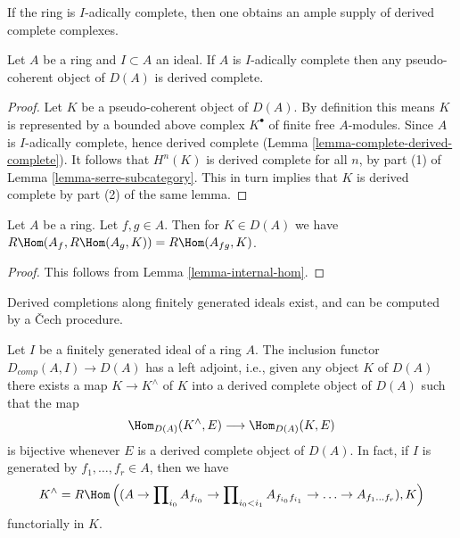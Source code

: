 \noindent
If the ring is $I$-adically complete, then one obtains an ample supply
of derived complete complexes.

\begin{lemma}
\label{lemma-pseudo-coherent-is-derived-complete}
Let $A$ be a ring and $I \subset A$ an ideal. If $A$ is $I$-adically complete
then any pseudo-coherent object of $D(A)$ is derived complete.
\end{lemma}

\begin{proof}
Let $K$ be a pseudo-coherent object of $D(A)$. By definition this
means $K$ is represented by a bounded above complex $K^\bullet$
of finite free $A$-modules. Since $A$ is $I$-adically complete, hence
derived complete (Lemma \ref{lemma-complete-derived-complete}).
It follows that $H^n(K)$ is derived complete for all $n$, by part (1)
of Lemma \ref{lemma-serre-subcategory}. This in turn implies that
$K$ is derived complete by part (2) of the same lemma.
\end{proof}

\begin{lemma}
\label{lemma-double-localize}
Let $A$ be a ring. Let $f, g \in A$. Then for $K \in D(A)$ we have
$R\Hom(A_f, R\Hom(A_g, K)) = R\Hom(A_{fg}, K)$.
\end{lemma}

\begin{proof}
This follows from Lemma \ref{lemma-internal-hom}.
\end{proof}

\begin{lemma}
\label{lemma-derived-completion}
\begin{slogan}
Derived completions along finitely generated ideals exist, and can
be computed by a {\v C}ech procedure.
\end{slogan}
Let $I$ be a finitely generated ideal of a ring $A$.
The inclusion functor $D_{comp}(A, I) \to D(A)$ has a
left adjoint, i.e., given any object $K$ of $D(A)$ there
exists a map $K \to K^\wedge$ of $K$ into a derived complete
object of $D(A)$ such that the map
$$
\Hom_{D(A)}(K^\wedge, E) \longrightarrow \Hom_{D(A)}(K, E)
$$
is bijective whenever $E$ is a derived complete object of $D(A)$.
In fact, if $I$ is generated by $f_1, \ldots, f_r \in A$, then we have
$$
K^\wedge = R\Hom\left((A \to \prod\nolimits_{i_0} A_{f_{i_0}} \to
\prod\nolimits_{i_0 < i_1} A_{f_{i_0}f_{i_1}}
\to \ldots \to A_{f_1\ldots f_r}), K\right)
$$
functorially in $K$.
\end{lemma}

